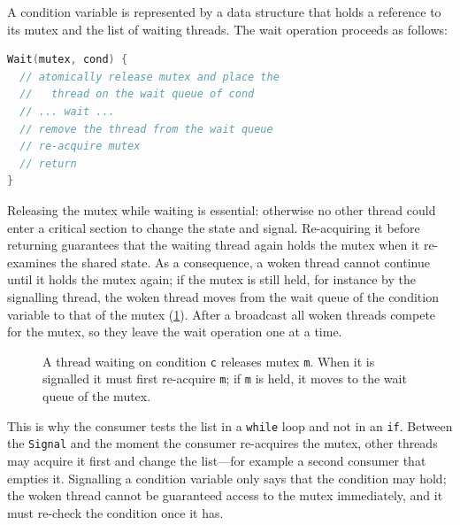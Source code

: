 \documentclass[../main.tex]{subfiles}
\begin{document}
A condition variable is represented by a data structure that holds a
reference to its mutex and the list of waiting threads.  The wait
operation proceeds as follows:
\begin{lstlisting}[language=C, numbers=none]
Wait(mutex, cond) {
  // atomically release mutex and place the
  //   thread on the wait queue of cond
  // ... wait ...
  // remove the thread from the wait queue
  // re-acquire mutex
  // return
}
\end{lstlisting}
Releasing the mutex while waiting is essential: otherwise no other thread
could enter a critical section to change the state and signal.
Re-acquiring it before returning guarantees that the waiting thread again
holds the mutex when it re-examines the shared state.  As a consequence, a
woken thread cannot continue until it holds the mutex again; if the mutex is
still held, for instance by the signalling thread, the woken thread moves
from the wait queue of the condition variable to that of the mutex
(\cref{fig:l03-cv-queues}).  After a
broadcast all woken threads compete for the mutex, so they leave the wait
operation one at a time.

\begin{figure}[htbp]
  \centering
  
  \caption{A thread waiting on condition \texttt{c} releases mutex
    \texttt{m}.  When it is signalled it must first re-acquire \texttt{m};
    if \texttt{m} is held, it moves to the wait queue of the mutex.}
  \label{fig:l03-cv-queues}
\end{figure}

This is why the consumer tests the list in a \texttt{while} loop and not in
an \texttt{if}.  Between the \texttt{Signal} and the moment the consumer
re-acquires the mutex, other threads may acquire it first and change the
list---for example a second consumer that empties it.  Signalling a
condition variable only says that the condition may hold; the woken thread
cannot be guaranteed access to the mutex immediately, and it must re-check
the condition once it has.
\end{document}
